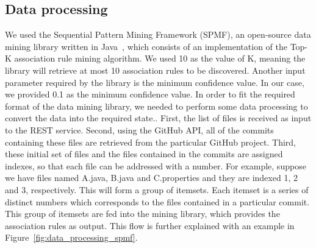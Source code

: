 \subsection{Data processing}
\label{sec:dataprocessing}

We used the Sequential Pattern Mining Framework (SPMF), an open-source data mining library written in Java~\cite{algo_impl}, which consists of an implementation of the Top-K association rule mining algorithm. We used 10 as the value of K, meaning the library will retrieve at most 10 association rules to be discovered. Another input parameter required by the library is the minimum confidence value. In our case, we provided 0.1 as the minimum confidence value. In order to fit the required format of the data mining library, we needed to perform some data processing to convert the data into the required state.. First, the list of files is received as input to the REST service. Second, using the GitHub API, all of the commits containing these files are retrieved from the particular GitHub project. Third, these initial set of files and the files contained in the commits are assigned indexes, so that each file can be addressed with a number. For example, suppose  we have files named A.java, B.java and C.properties and they are indexed 1, 2 and 3, respectively. This will form a  group of itemsets. Each itemset is a series of distinct numbers which corresponds to the files contained in a particular commit. This group of itemsets are fed into the mining library, which provides the association rules as output. This flow is further explained with an example in Figure~\ref{fig:data_processing_spmf}.
